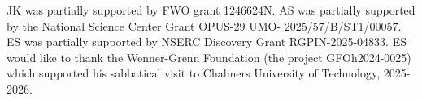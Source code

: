 \documentclass[12pt]{amsart}
\theoremstyle{definition}
\theoremstyle{remark}
\numberwithin{equation}{section}
\newcommand{\C}{\mathbb{C}}
\begin{document}
JK was partially supported by FWO grant 1246624N. AS was partially supported by the National Science Center Grant OPUS-29 UMO-
2025/57/B/ST1/00057. ES was partially supported by NSERC Discovery Grant RGPIN-2025-04833. ES would like to thank the Wenner-Grenn Foundation (the project GFOh2024-0025) which supported his sabbatical visit to Chalmers University of Technology, 2025-2026. 





\end{document}
